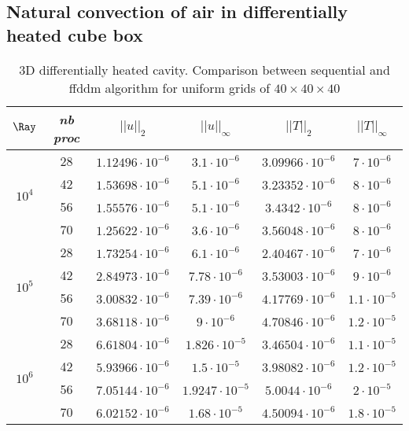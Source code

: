 \subsection{Natural convection of air in differentially heated cube box} \label{subsec-3D-natconv-air}

\begin{table}[!ht]
	\begin{center}
		\begin{tabular}{|*{6}{c|}}
			\hline
			 $\Ray$ & \em{nb proc }                  & $||u||_{2}$                        & $||u||_{\infty}$                & $||T||_{2}$              & $||T||_{\infty}$\\ \hline \hline
			\multirow{4}{*}{$10^4$} & 28 & $1.12496 \cdot 10^{-6}$ & $3.1 \cdot 10^{-6}$ & $ 3.09966 \cdot 10^{-6} $ & $7 \cdot 10^{-6}$ \\%
			\cline{2-6}
			& 42 & $1.53698 \cdot 10^{-6}$ & $5.1 \cdot 10^{-6}$ & $ 3.23352 \cdot 10^{-6} $ & $8 \cdot 10^{-6}$ \\ \cline{2-6} %
			& 56 & $1.55576 \cdot 10^{-6}$ & $5.1 \cdot 10^{-6}$ & $ 3.4342 \cdot 10^{-6} $ & $8 \cdot 10^{-6}$  \\ \cline{2-6} %
			& 70 & $1.25622 \cdot 10^{-6}$ & $3.6 \cdot 10^{-6}$ & $ 3.56048 \cdot 10^{-6} $ & $8 \cdot 10^{-6}$ \\ \hline \hline
			\multirow{4}{*}{$10^5$} & 28 & $1.73254 \cdot 10^{-6}$ & $6.1 \cdot 10^{-6}$ & $ 2.40467 \cdot 10^{-6} $ & $7 \cdot 10^{-6}$ \\%
			\cline{2-6}
			& 42 & $2.84973 \cdot 10^{-6}$ & $7.78 \cdot 10^{-6}$ & $ 3.53003 \cdot 10^{-6} $ & $9 \cdot 10^{-6}$ \\ \cline{2-6} %
			& 56 & $3.00832 \cdot 10^{-6}$ & $7.39 \cdot 10^{-6}$ & $ 4.17769 \cdot 10^{-6} $ & $1.1 \cdot 10^{-5}$  \\ \cline{2-6} %
			& 70 & $3.68118 \cdot 10^{-6}$ & $9 \cdot 10^{-6}$ & $ 4.70846 \cdot 10^{-6} $ & $1.2 \cdot 10^{-5}$ \\ \hline \hline
			\multirow{4}{*}{$10^6$} & 28 & $6.61804 \cdot 10^{-6}$ & $1.826 \cdot 10^{-5}$ & $ 3.46504\cdot 10^{-6} $ & $1.1 \cdot 10^{-5}$ \\%
			\cline{2-6}
			& 42 & $5.93966 \cdot 10^{-6}$ & $1.5 \cdot 10^{-5}$ & $ 3.98082 \cdot 10^{-6} $ & $1.2 \cdot 10^{-5}$ \\ \cline{2-6} %
			& 56 & $7.05144 \cdot 10^{-6}$ & $1.9247 \cdot 10^{-5}$ & $ 5.0044 \cdot 10^{-6} $ & $2 \cdot 10^{-5}$  \\ \cline{2-6} %
			& 70 & $6.02152 \cdot 10^{-6}$ & $1.68 \cdot 10^{-5}$ & $ 4.50094 \cdot 10^{-6} $ & $1.8 \cdot 10^{-5}$ \\ \hline
		\end{tabular}
	\end{center}
	\caption {3D differentially heated cavity. Comparison between sequential and ffddm algorithm for uniform grids of $40 \times 40 \times 40$ }
	\label{tab-T1}
\end{table}

